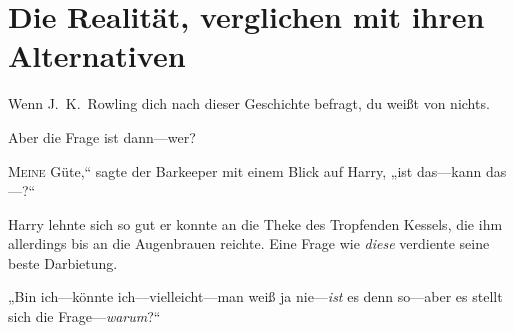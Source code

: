 \chapter{Die Realität, verglichen mit ihren Alternativen}

\begin{chapterOpeningAuthorNote}
Wenn J.~K.~Rowling dich nach dieser Geschichte befragt, du weißt von nichts.
\end{chapterOpeningAuthorNote}
\begin{chapterOpeningQuote}
Aber die Frage ist dann—wer?
\end{chapterOpeningQuote}

\lettrine[ante=„]{M}{eine} Güte,“ sagte der Barkeeper mit einem Blick auf Harry, „ist das—kann das—?“

Harry lehnte sich so gut er konnte an die Theke des Tropfenden Kessels, die ihm allerdings bis an die Augenbrauen reichte. Eine Frage wie \emph{diese} verdiente seine beste Darbietung.

„Bin ich—könnte ich—vielleicht—man weiß ja nie—\emph{ist} es denn so—aber es stellt sich die Frage—\emph{warum}?“

